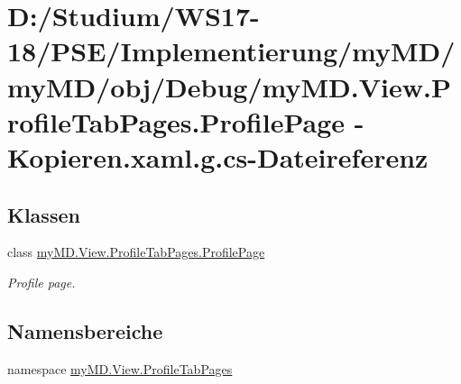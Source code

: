 \hypertarget{my_m_d_8_view_8_profile_tab_pages_8_profile_page_01-_01_kopieren_8xaml_8g_8cs}{}\section{D\+:/\+Studium/\+W\+S17-\/18/\+P\+S\+E/\+Implementierung/my\+M\+D/my\+M\+D/obj/\+Debug/my\+MD.View.\+Profile\+Tab\+Pages.\+Profile\+Page -\/ Kopieren.\+xaml.\+g.\+cs-\/\+Dateireferenz}
\label{my_m_d_8_view_8_profile_tab_pages_8_profile_page_01-_01_kopieren_8xaml_8g_8cs}
\subsection*{Klassen}
\begin{DoxyCompactItemize}
\item 
class \mbox{\hyperlink{classmy_m_d_1_1_view_1_1_profile_tab_pages_1_1_profile_page}{my\+M\+D.\+View.\+Profile\+Tab\+Pages.\+Profile\+Page}}
\begin{DoxyCompactList}\small\item\em Profile page. \end{DoxyCompactList}\end{DoxyCompactItemize}
\subsection*{Namensbereiche}
\begin{DoxyCompactItemize}
\item 
namespace \mbox{\hyperlink{namespacemy_m_d_1_1_view_1_1_profile_tab_pages}{my\+M\+D.\+View.\+Profile\+Tab\+Pages}}
\end{DoxyCompactItemize}
